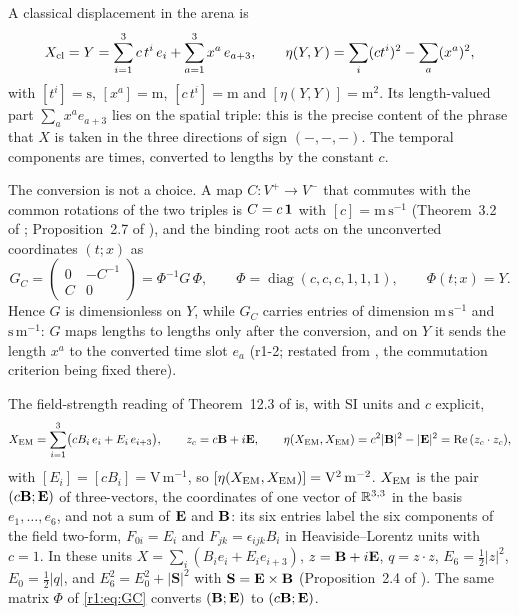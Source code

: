 \begin{definition}
\label{r1:def:cl}
A classical displacement in the arena is
\begin{equation}
\label{r1:eq:Y}
X_{\rm cl}=Y=\sum_{i=1}^3c\,t^i\,e_i+\sum_{a=1}^3x^a\,e_{a+3},\qquad \eta(Y,Y)=\sum_i(ct^i)^2-\sum_a(x^a)^2,
\end{equation}
with $[t^i]=\mathrm s$, $[x^a]=\mathrm m$, $[c\,t^i]=\mathrm m$ and $[\eta(Y,Y)]=\mathrm m^2$. Its length-valued part $\sum_ax^ae_{a+3}$ lies on the spatial triple: this is the precise content of the phrase that $X$ is taken in the
three directions of sign $(-,-,-)$. The temporal components are times, converted to lengths by the constant $c$.
\end{definition}

The conversion is not a choice. A map $C:V^+\to V^-$ that commutes with the common rotations of the two triples is $C=c\,\mathbf 1$ with
$[c]=\mathrm{m\,s^{-1}}$ (Theorem~3.2 of \cite{ES17}; Proposition~2.7 of \cite{RE}), and the binding root acts on the unconverted
coordinates $(t;x)$ as
\begin{equation}
\label{r1:eq:GC}
G_C=\begin{pmatrix}0&-C^{-1}\\ C&0\end{pmatrix}=\Phi^{-1}G\,\Phi,\qquad \Phi=\operatorname{diag}(c,c,c,1,1,1),\qquad \Phi(t;x)=Y .
\end{equation}
Hence $G$ is dimensionless on $Y$, while $G_C$ carries entries of dimension $\mathrm{m\,s^{-1}}$ and $\mathrm{s\,m^{-1}}$: $G$ maps
lengths to lengths only after the conversion, and on $Y$ it sends the length $x^a$ to the converted time slot $e_a$ (r1-2; restated
from \cite{ES17,RE}, the commutation criterion being fixed there).

\begin{definition}
\label{r1:def:em}
The field-strength reading of Theorem~12.3 of \cite{ES17} is, with SI units and $c$ explicit,
\begin{equation}
\label{r1:eq:XEM}
X_{\rm EM}=\sum_{i=1}^3\bigl(cB_i\,e_i+E_i\,e_{i+3}\bigr),\qquad z_c=c\mathbf B+i\mathbf E,\qquad
\eta(X_{\rm EM},X_{\rm EM})=c^2|\mathbf B|^2-|\mathbf E|^2=\operatorname{Re}\,(z_c\cdot z_c),
\end{equation}
with $[E_i]=[cB_i]=\mathrm{V\,m^{-1}}$, so $[\eta(X_{\rm EM},X_{\rm EM})]=\mathrm{V^2\,m^{-2}}$. $X_{\rm EM}$ is the pair $(c\mathbf B;\mathbf E)$ of
three-vectors, the coordinates of one vector of $\mathbb{R}^{3,3}$ in the basis $e_1,\dots,e_6$, and not a sum of $\mathbf E$ and $\mathbf B$: its six
entries label the six components of the field two-form, $F_{0i}=E_i$ and $F_{jk}=\epsilon_{ijk}B_i$ in Heaviside--Lorentz units with
$c=1$. In these units $X=\sum_i(B_ie_i+E_ie_{i+3})$,
$z=\mathbf B+i\mathbf E$, $q=z\cdot z$, $E_6=\tfrac12|z|^2$, $E_0=\tfrac12|q|$, and $E_6^2=E_0^2+|\mathbf S|^2$ with $\mathbf S=\mathbf E\times\mathbf B$
(Proposition~2.4 of \cite{RE}). The same matrix $\Phi$ of \eqref{r1:eq:GC} converts $(\mathbf B;\mathbf E)$ to $(c\mathbf B;\mathbf E)$.
\end{definition}


